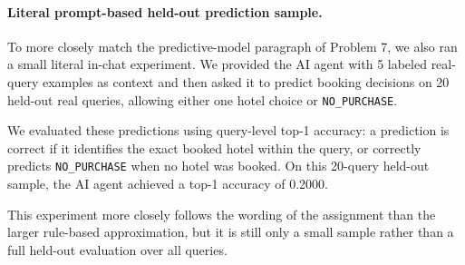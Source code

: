 
\paragraph{Literal prompt-based held-out prediction sample.}
To more closely match the predictive-model paragraph of Problem 7, we also ran a small literal in-chat experiment. We provided the AI agent with 5 labeled real-query examples as context and then asked it to predict booking decisions on 20 held-out real queries, allowing either one hotel choice or \texttt{NO\_PURCHASE}. 

We evaluated these predictions using query-level top-1 accuracy: a prediction is correct if it identifies the exact booked hotel within the query, or correctly predicts \texttt{NO\_PURCHASE} when no hotel was booked. On this 20-query held-out sample, the AI agent achieved a top-1 accuracy of 0.2000.

This experiment more closely follows the wording of the assignment than the larger rule-based approximation, but it is still only a small sample rather than a full held-out evaluation over all queries.
